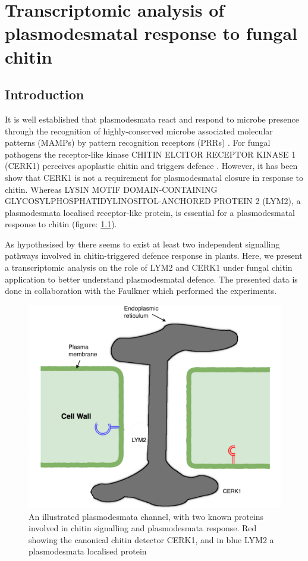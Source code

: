 \documentclass[../main.tex]{subfiles}
\begin{document}
\chapter{Transcriptomic analysis of plasmodesmatal response to fungal chitin}
\label{cha:transcripts}

\section{Introduction}
It is well established that plasmodesmata react and respond to microbe presence
through the recognition of highly-conserved microbe associated molecular
patterns (MAMPs) by pattern recognition receptors (PRRs)
\cite{chevalPlasmodesmalRegulationPlant2018,
  zipfelPlantPatternrecognitionReceptors2014,
  lunaCalloseDepositionMultifaceted2010}. For fungal pathogens the receptor-like
kinase CHITIN ELCITOR RECEPTOR KINASE 1 (CERK1) perceives apoplastic chitin and
triggers defence \cite{miyaCERK1LysMReceptor2007}. However, it has been show
that CERK1 is not a requirement for plasmodesmatal closure in response to
chitin. Whereas LYSIN MOTIF DOMAIN-CONTAINING
GLYCOSYLPHOSPHATIDYLINOSITOL-ANCHORED PROTEIN 2 (LYM2), a plasmodesmata
localised receptor-like protein, is essential for a plasmodesmatal response to
chitin \cite{Faulkner2013} (figure: \ref{fig:receptors}).


As hypothesised by \citet{Faulkner2013} there seems to exist at least two
independent signalling pathways involved in chitin-triggered defence response in
plants. Here, we present a transcriptomic analysis on the role of LYM2 and CERK1
under fungal chitin application to better understand plasmodesmatal defence. The
presented data is done in collaboration with the Faulkner which performed the
experiments.


\begin{figure}[ht]
  \centering
  \includegraphics[width=0.5\columnwidth]{figures/original desmotubule.png}
  \caption[Plasmodesmata, \textit{lym2-1} and\textit{cerk2-1}diagram]{\label{fig:receptors}
    An illustrated plasmodesmata channel, with two
    known proteins involved in chitin signalling and plasmodesmata response. Red
    showing the canonical chitin detector CERK1, and in blue LYM2 a
    plasmodesmata localised protein}
\end{figure}
\end{document}
